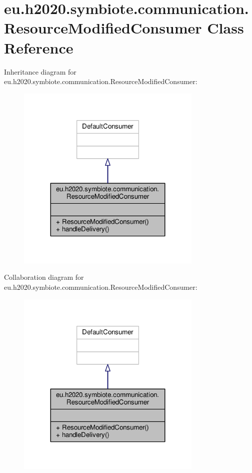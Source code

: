 \hypertarget{classeu_1_1h2020_1_1symbiote_1_1communication_1_1ResourceModifiedConsumer}{}\section{eu.\+h2020.\+symbiote.\+communication.\+Resource\+Modified\+Consumer Class Reference}
\label{classeu_1_1h2020_1_1symbiote_1_1communication_1_1ResourceModifiedConsumer}


Inheritance diagram for eu.\+h2020.\+symbiote.\+communication.\+Resource\+Modified\+Consumer\+:
\nopagebreak
\begin{figure}[H]
\begin{center}
\leavevmode
\includegraphics[width=251pt]{classeu_1_1h2020_1_1symbiote_1_1communication_1_1ResourceModifiedConsumer__inherit__graph}
\end{center}
\end{figure}


Collaboration diagram for eu.\+h2020.\+symbiote.\+communication.\+Resource\+Modified\+Consumer\+:
\nopagebreak
\begin{figure}[H]
\begin{center}
\leavevmode
\includegraphics[width=251pt]{classeu_1_1h2020_1_1symbiote_1_1communication_1_1ResourceModifiedConsumer__coll__graph}
\end{center}
\end{figure}
